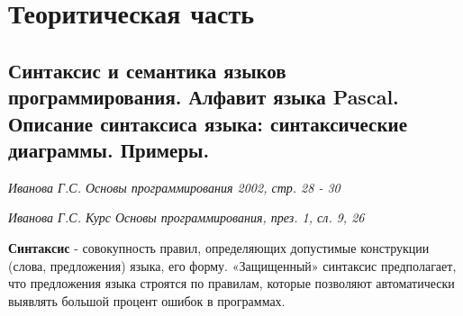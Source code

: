 


\newcommand{\hbook}[1]{{\small\begin{center}\textit{Иванова Г.С. Основы программирования 2002, стр. #1}\end{center}}}
\newcommand{\hprez}[2]{{\small\begin{center}\textit{Иванова Г.С. Курс Основы программирования, през. #1, сл. #2}\end{center}}}




\toc

\section{Теоритическая часть}


\subsection{Синтаксис  и  семантика  языков  программирования.  Алфавит  языка  Pascal.  Описание синтаксиса языка: синтаксические диаграммы. Примеры. }

\begin{myquote}
\hbook{28 - 30}

\hprez{1}{9, 26}
\end{myquote}
\large

{\bf{Синтаксис}}
 - совокупность правил, определяющих допустимые конструкции (слова, предложения) языка, его форму. «Защищенный» синтаксис предполагает, что предложения языка строятся по правилам, которые позволяют автоматически выявлять большой процент ошибок в программах.

